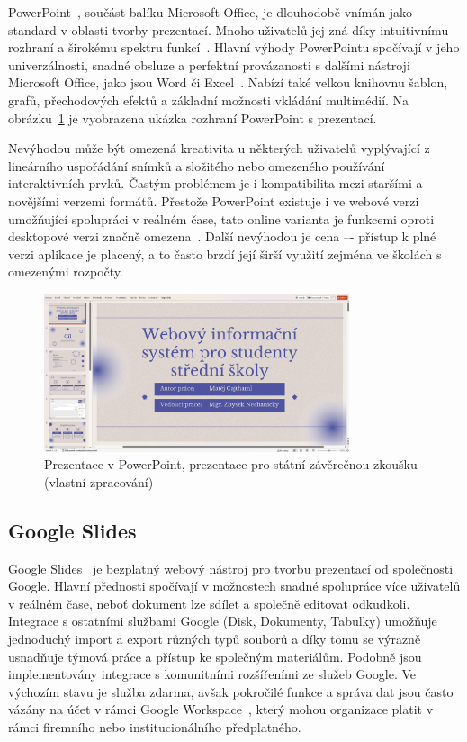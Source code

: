 PowerPoint~\cite{pp_usage}, součást balíku Microsoft Office, je dlouhodobě vnímán jako standard v oblasti tvorby prezentací.
Mnoho uživatelů jej zná díky intuitivnímu rozhraní a širokému spektru funkcí~\cite{pp_usage}.
Hlavní výhody PowerPointu spočívají v jeho univerzálnosti, snadné obsluze a perfektní provázanosti s dalšími nástroji Microsoft Office, jako jsou Word či Excel~\cite{pp_excel, pp_word}.
Nabízí také velkou knihovnu šablon, grafů, přechodových efektů a základní možnosti vkládání multimédií.
Na obrázku~\ref{fig:analyza/powerpoint} je vyobrazena ukázka rozhraní PowerPoint s prezentací. 

Nevýhodou může být omezená kreativita u některých uživatelů vyplývající z lineárního uspořádání snímků a složitého nebo omezeného používání interaktivních prvků. 
Častým problémem je i kompatibilita mezi staršími a novějšími verzemi formátů.
Přestože PowerPoint existuje i ve webové verzi umožňující spolupráci v reálném čase, tato online varianta je funkcemi oproti desktopové verzi značně omezena~\cite{pp_platforms}.
Další nevýhodou je cena –- přístup k plné verzi aplikace je placený, a to často brzdí její širší využití zejména ve školách s omezenými rozpočty.

\begin{figure}[ht!]
    \centering
    \includegraphics[width=0.8\textwidth]{media/03_analyza/powerpoint.png}
    \caption[Prezentace v PowerPoint, prezentace pro státní závěrečnou zkoušku]{Prezentace v PowerPoint, prezentace pro státní závěrečnou zkoušku (vlastní zpracování)}
    \label{fig:analyza/powerpoint}
\end{figure}


\subsection{Google Slides}\label{text:google_slides}

Google Slides~\cite{slides} je bezplatný webový nástroj pro tvorbu prezentací od společnosti Google. 
Hlavní přednosti spočívají v možnostech snadné spolupráce více uživatelů v reálném čase, neboť dokument lze sdílet a společně editovat odkudkoli.
Integrace s ostatními službami Google (Disk, Dokumenty, Tabulky) umožňuje jednoduchý import a export různých typů souborů a díky tomu se výrazně usnadňuje týmová práce a přístup ke společným materiálům. 
Podobně jsou implementovány integrace s komunitními rozšířeními ze služeb Google.
Ve výchozím stavu je služba zdarma, avšak pokročilé funkce a správa dat jsou často vázány na účet v rámci Google Workspace~\cite{slides}, který mohou organizace platit v rámci firemního nebo institucionálního předplatného. 

